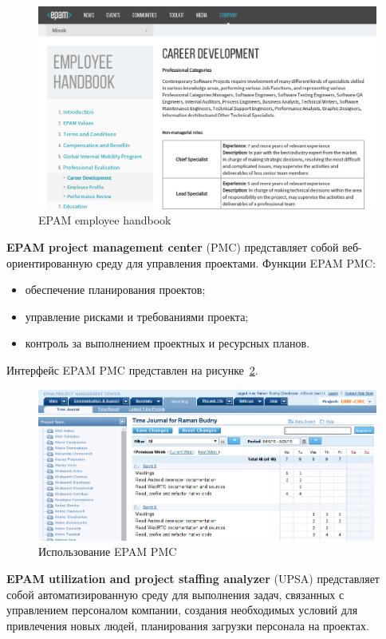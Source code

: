 \begin{figure}[h!]
  \centering
  \includegraphics[width=130mm]{fig/epam_handbook.png}
  \caption{EPAM employee handbook}
  \label{pic:epam_handbook}
\end{figure}

\textbf{EPAM project management center} (PMC) представляет собой веб-ориентированную среду
для управления проектами.
Функции EPAM PMC:
\begin{itemize}
\item обеспечение планирования проектов;
\item управление рисками и требованиями проекта;
\item контроль за выполнением проектных и ресурсных планов.
\end{itemize}

Интерфейс EPAM PMC представлен на рисунке~\ref{pic:epam_pmc}.

\begin{figure}[h!]
  \centering
  \includegraphics[width=130mm]{fig/epam_pmc.png}
  \caption{Использование EPAM PMC}
  \label{pic:epam_pmc}
\end{figure}

\textbf{EPAM utilization and project staffing analyzer} (UPSA) представляет собой
автоматизированную среду для выполнения задач, связанных с управлением персоналом компании,
создания необходимых условий для привлечения новых людей, планирования загрузки персонала на проектах.

